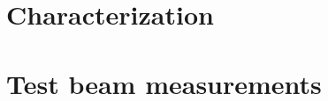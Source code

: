 \documentclass[a4paper,11pt]{report}
\begin{document}
\linenumbers



\tableofcontents




%

%

%

%
%

\chapter{Characterization}


\chapter{Test beam measurements}


\printbibliography[heading=bibintoc, title={Bibliography}] 
\end{document}
